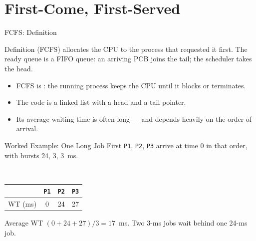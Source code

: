 \documentclass[aspectratio=169]{beamer}
\begin{document}
\section{First-Come, First-Served}

\begin{frame}{FCFS: Definition}
  \begin{block}{Definition}
     (FCFS) allocates the CPU to the process
    that requested it first. The ready queue is a FIFO queue: an arriving
    PCB joins the tail; the scheduler takes the head.
  \end{block}
  \begin{itemize}
    \item FCFS is : the running process keeps the CPU
      until it blocks or terminates.
    \item The code is a linked list with a head and a tail pointer.
    \item Its average waiting time is often long --- and depends heavily on
      the order of arrival.
  \end{itemize}
\end{frame}

\begin{frame}{Worked Example: One Long Job First}
  \centering
  \footnotesize
  \texttt{P1}, \texttt{P2}, \texttt{P3} arrive at time 0 in that order, with
  bursts 24, 3, 3~ms.\\[0.25cm]
  \\[0.25cm]
  \begin{tabular}{lccc}
    \toprule
    & \texttt{P1} & \texttt{P2} & \texttt{P3} \\
    \midrule
    WT (ms) & 0 & 24 & 27 \\
    \bottomrule
  \end{tabular}
  \vspace{0.2cm}
  \begin{alertblock}{Average WT}
    $(0 + 24 + 27)/3 = 17$~ms. Two 3-ms jobs wait behind one 24-ms job.
  \end{alertblock}
\end{frame}
\end{document}
